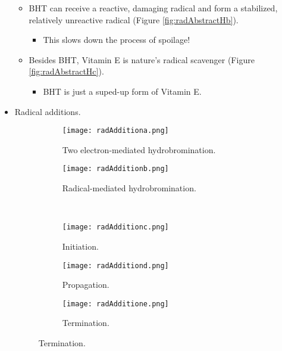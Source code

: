 \documentclass[../notes.tex]{subfiles}
\begin{document}
\begin{itemize}
\begin{itemize}
\begin{itemize}
        \end{itemize}
        \item BHT can receive a reactive, damaging radical and form a stabilized, relatively unreactive radical (Figure \ref{fig:radAbstractHb}).
        \begin{itemize}
            \item This slows down the process of spoilage!
        \end{itemize}
        \item Besides BHT, Vitamin E is nature's radical scavenger (Figure \ref{fig:radAbstractHc}).
        \begin{itemize}
            \item BHT is just a suped-up form of Vitamin E.
        \end{itemize}
    \end{itemize}
    \item Radical additions.
    \begin{figure}[h!]
        \centering
        \begin{subfigure}[b]{0.49\linewidth}
            \centering
            \texttt{[image: radAdditiona.png]}
            \caption{Two electron-mediated hydrobromination.}
            \label{fig:radAdditiona}
        \end{subfigure}
        \begin{subfigure}[b]{0.49\linewidth}
            \centering
            \texttt{[image: radAdditionb.png]}
            \caption{Radical-mediated hydrobromination.}
            \label{fig:radAdditionb}
        \end{subfigure}\\[2em]
        \begin{subfigure}[b]{0.33\linewidth}
            \centering
            \texttt{[image: radAdditionc.png]}
            \caption{Initiation.}
            \label{fig:radAdditionc}
        \end{subfigure}
        \begin{subfigure}[b]{0.32\linewidth}
            \centering
            \texttt{[image: radAdditiond.png]}
            \caption{Propagation.}
            \label{fig:radAdditiond}
        \end{subfigure}
        \begin{subfigure}[b]{0.33\linewidth}
            \centering
            \texttt{[image: radAdditione.png]}
            \caption{Termination.}

\end{subfigure}
\end{figure}
\end{itemize}
\end{document}
